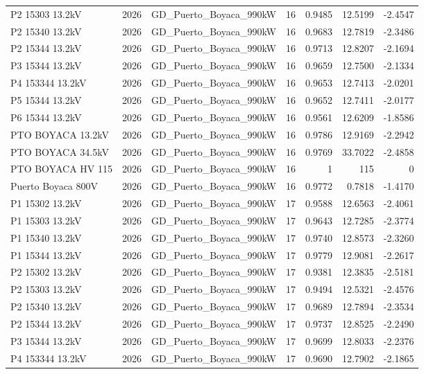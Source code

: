 \documentclass[11pt,a4paper]{article}
\begin{document}
\begin{longtable}{llllrrr}
P2 15303 13.2kV & 2026 & GD\_Puerto\_Boyaca\_990kW & 16 & 0.9485 & 12.5199 & -2.4547 \\
P2 15340 13.2kV & 2026 & GD\_Puerto\_Boyaca\_990kW & 16 & 0.9683 & 12.7819 & -2.3486 \\
P2 15344 13.2kV & 2026 & GD\_Puerto\_Boyaca\_990kW & 16 & 0.9713 & 12.8207 & -2.1694 \\
P3 15344 13.2kV & 2026 & GD\_Puerto\_Boyaca\_990kW & 16 & 0.9659 & 12.7500 & -2.1334 \\
P4 153344 13.2kV & 2026 & GD\_Puerto\_Boyaca\_990kW & 16 & 0.9653 & 12.7413 & -2.0201 \\
P5 15344 13.2kV & 2026 & GD\_Puerto\_Boyaca\_990kW & 16 & 0.9652 & 12.7411 & -2.0177 \\
P6 15344 13.2kV & 2026 & GD\_Puerto\_Boyaca\_990kW & 16 & 0.9561 & 12.6209 & -1.8586 \\
PTO BOYACA 13.2kV & 2026 & GD\_Puerto\_Boyaca\_990kW & 16 & 0.9786 & 12.9169 & -2.2942 \\
PTO BOYACA 34.5kV & 2026 & GD\_Puerto\_Boyaca\_990kW & 16 & 0.9769 & 33.7022 & -2.4858 \\
PTO BOYACA HV 115 & 2026 & GD\_Puerto\_Boyaca\_990kW & 16 & 1 & 115 & 0 \\
Puerto Boyaca 800V & 2026 & GD\_Puerto\_Boyaca\_990kW & 16 & 0.9772 & 0.7818 & -1.4170 \\
P1 15302 13.2kV & 2026 & GD\_Puerto\_Boyaca\_990kW & 17 & 0.9588 & 12.6563 & -2.4061 \\
P1 15303 13.2kV & 2026 & GD\_Puerto\_Boyaca\_990kW & 17 & 0.9643 & 12.7285 & -2.3774 \\
P1 15340 13.2kV & 2026 & GD\_Puerto\_Boyaca\_990kW & 17 & 0.9740 & 12.8573 & -2.3260 \\
P1 15344 13.2kV & 2026 & GD\_Puerto\_Boyaca\_990kW & 17 & 0.9779 & 12.9081 & -2.2617 \\
P2 15302 13.2kV & 2026 & GD\_Puerto\_Boyaca\_990kW & 17 & 0.9381 & 12.3835 & -2.5181 \\
P2 15303 13.2kV & 2026 & GD\_Puerto\_Boyaca\_990kW & 17 & 0.9494 & 12.5321 & -2.4576 \\
P2 15340 13.2kV & 2026 & GD\_Puerto\_Boyaca\_990kW & 17 & 0.9689 & 12.7894 & -2.3534 \\
P2 15344 13.2kV & 2026 & GD\_Puerto\_Boyaca\_990kW & 17 & 0.9737 & 12.8525 & -2.2490 \\
P3 15344 13.2kV & 2026 & GD\_Puerto\_Boyaca\_990kW & 17 & 0.9699 & 12.8033 & -2.2376 \\
P4 153344 13.2kV & 2026 & GD\_Puerto\_Boyaca\_990kW & 17 & 0.9690 & 12.7902 & -2.1865 \\

\end{longtable}
\end{document}
